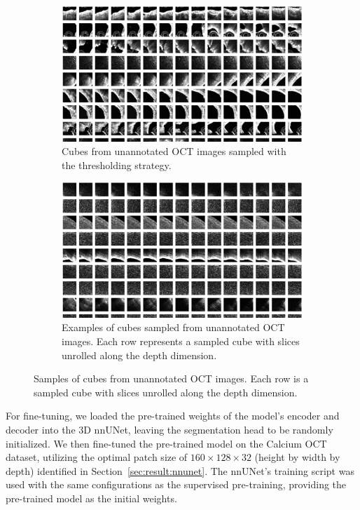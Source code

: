 \documentclass[a4paper,11pt,oneside]{report}
\begin{document}
\begin{figure}[t]
    \centering
    \begin{subfigure}[t]{0.48\textwidth}
        \centering
        \includegraphics[width=0.9\linewidth]{figures/fig_implementation_genesis_extracted_cube.png}
        \caption{Cubes from unannotated OCT images sampled with the thresholding strategy.}
        \label{fig:genesis-cubes-with-threshold}

    \end{subfigure}%
    \hfill
    \begin{subfigure}[t]{0.48\textwidth}
        \centering
        \includegraphics[width=0.9\linewidth]{figures/fig_implementation_genesis_extracted_cube_no_threshold.png}
        \caption{Examples of cubes sampled from unannotated OCT images. Each row represents a sampled cube with slices unrolled along the depth dimension.}
        \label{fig:genesis-cubes-without-threshold}
    \end{subfigure}
    \caption{Samples of cubes from unannotated OCT images. Each row is a sampled cube with slices unrolled along the depth dimension.}
\end{figure}

For fine-tuning, we loaded the pre-trained weights of the model's encoder and decoder into the 3D nnUNet, leaving the segmentation head to be randomly initialized. We then fine-tuned the pre-trained model on the Calcium OCT dataset, utilizing the optimal patch size of $160\times 128\times 32$ (height by width by depth) identified in Section~\ref{sec:result:nnunet}. The nnUNet's training script was used with the same configurations as the supervised pre-training, providing the pre-trained model as the initial weights.
\end{document}
